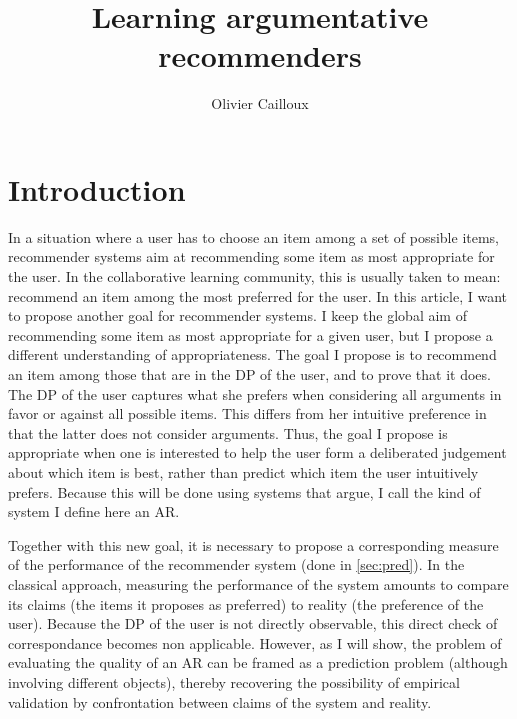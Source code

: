 \documentclass[french, english]{da2pl2018}
\begin{document}
\title{%
	Learning argumentative recommenders%
}
\author{Olivier Cailloux}
\makeatletter
\makeatother
\maketitle

\section{Introduction}
In a situation where a user has to choose an item among a set of possible items, recommender systems aim at recommending some item as most appropriate for the user.
In the collaborative learning community, this is usually taken to mean: recommend an item among the most preferred for the user. In this article, I want to propose another goal for recommender systems. I keep the global aim of recommending some item as most appropriate for a given user, but I propose a different understanding of appropriateness. The goal I propose is to recommend an item among those that are in the \ac{DP} of the user, and to prove that it does. The \ac{DP} of the user captures what she prefers when considering all arguments in favor or against all possible items. This differs from her intuitive preference in that the latter does not consider arguments. Thus, the goal I propose is appropriate when one is interested to help the user form a deliberated judgement about which item is best, rather than predict which item the user intuitively prefers. Because this will be done using systems that argue, I call the kind of system I define here an \ac{AR}.

Together with this new goal, it is necessary to propose a corresponding measure of the performance of the recommender system (done in \cref{sec:pred}). In the classical approach, measuring the performance of the system amounts to compare its claims (the items it proposes as preferred) to reality (the preference of the user). Because the \ac{DP} of the user is not directly observable, this direct check of correspondance becomes non applicable. However, as I will show, the problem of evaluating the quality of an \ac{AR} can be framed as a prediction problem (although involving different objects), thereby recovering the possibility of empirical validation by confrontation between claims of the system and reality.
\end{document}
